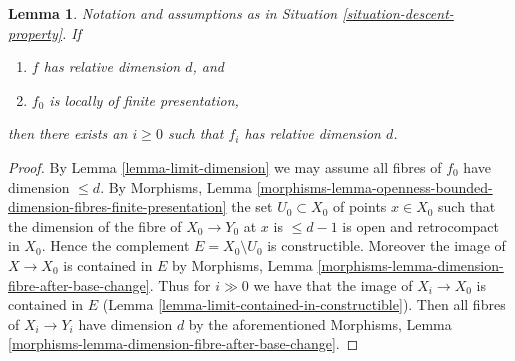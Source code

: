 \documentclass[10pt,a4paper]{amsart}
\theoremstyle{plain}
\newtheorem{lemma}[subsection]{Lemma}
\theoremstyle{definition}
\theoremstyle{remark}
\numberwithin{equation}{subsection}
\begin{document}
\begin{lemma}
\label{lemma-descend-dimension-d}
Notation and assumptions as in Situation \ref{situation-descent-property}.
If
\begin{enumerate}
\item $f$ has relative dimension $d$, and
\item $f_0$ is locally of finite presentation,
\end{enumerate}
then there exists an $i \geq 0$ such that $f_i$
has relative dimension $d$.
\end{lemma}

\begin{proof}
By Lemma \ref{lemma-limit-dimension} we may assume all fibres
of $f_0$ have dimension $\leq d$. By Morphisms, Lemma
\ref{morphisms-lemma-openness-bounded-dimension-fibres-finite-presentation}
the set $U_0 \subset X_0$ of points $x \in X_0$ such that
the dimension of the fibre of $X_0 \to Y_0$ at $x$ is $\leq d - 1$
is open and retrocompact in $X_0$. Hence the complement
$E = X_0 \setminus U_0$ is constructible.
Moreover the image of $X \to X_0$ is contained in $E$
by Morphisms, Lemma \ref{morphisms-lemma-dimension-fibre-after-base-change}.
Thus for $i \gg 0$ we have that the image
of $X_i \to X_0$ is contained in $E$
(Lemma \ref{lemma-limit-contained-in-constructible}). Then all fibres
of $X_i \to Y_i$ have dimension $d$ by the aforementioned
Morphisms, Lemma \ref{morphisms-lemma-dimension-fibre-after-base-change}.
\end{proof}
\end{document}
